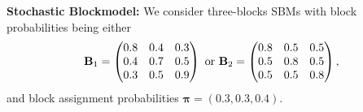 \documentclass[10pt,journal,compsoc]{IEEEtran}
\newcommand{\bds}{\boldsymbol}
\newcommand{\M}[1]{{{\mathbf{\MakeUppercase{#1}}}}}
\numberwithin{equation}{section}
\begin{document}
\noindent\textbf{Stochastic Blockmodel:}
We consider three-blocks SBMs with block
probabilities being either
\begin{equation}
\label{eq:Bmat_simulations}
\M B_1 = \begin{pmatrix}
0.8 & 0.4 & 0.3 
\\
0.4 & 0.7 & 0.5
\\
0.3 & 0.5 & 0.9
\end{pmatrix} \,\, \text{or} \,\, \M B_2 =  \begin{pmatrix}
0.8 & 0.5 & 0.5 
\\
0.5 & 0.8 & 0.5
\\
0.5 & 0.5 & 0.8
\end{pmatrix},
\end{equation}
and block assignment probabilities $\bds\pi = (0.3,0.3,0.4)$. %
\end{document}
